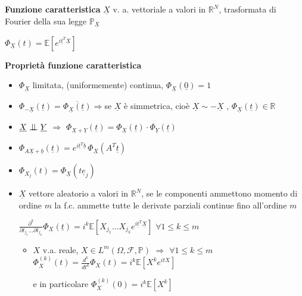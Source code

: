 \documentclass[openany]{book} %
\newcommand{\ind}{\mathrel{\text{\scalebox{1.07}{$\perp\mkern-10mu\perp$}}}}
\begin{document}
\textbf{Funzione caratteristica} $\underline{X}$ v. a. vettoriale a valori in $\mathbb{R}^N$, trasformata di Fourier della sua legge $\mathbb{P}_{\underline{X}}$

$\Phi_{\underline{X}}(t)=\mathbb{E}\left[e^{i \underline{t}^T \underline{X}}\right]$

\textbf{Proprietà funzione caratteristica}

\begin{itemize}

\item $\Phi_{\underline{X}}$ limitata, (uniformemente) continua, $\Phi_{\underline{X}}(\underline{0})=1$

\item $\Phi_{-\underline{X}}(\underline{t}) = \overline{\Phi_{\underline{X}}(\underline{t})}$\quad$ \Rightarrow$\quad se $\underline{X}$ è simmetrica, cioè $\underline{X}\sim-\underline{X}$ , \quad $\Phi_{\underline{X}}(\underline{t})\in \mathbb{R}$

\item $\underline{X}\ind \underline{Y}$ \quad $\Rightarrow$ \quad $\Phi_{\underline{X}+\underline{Y}}(\underline{t})=\Phi_{\underline{X}}(\underline{t})\cdot\Phi_{\underline{Y}}(\underline{t})$

\item $\Phi_{A\underline{X}+\underline{b}}(\underline{t})= e^{i \underline{t}^T \underline{b}}\,\Phi_{\underline{X}}(A^T\underline{t})$

\item $\Phi_{X_j}(t) = \Phi_{\underline{X}}(t\underline{e}_j)$

\item $\underline{X}$ vettore aleatorio a valori in $\mathbb{R}^N$, se le componenti ammettono momento di ordine $m$ la f.c. ammette tutte le derivate parziali continue fino all'ordine $m$

$\frac{\partial^k}{\partial t_{j_1}\dots\partial t_{j_k}}\Phi_{\underline{X}}(\underline{t}) =i^k \mathbb{E}\left[X_{j_1}\dots X_{j_k}e^{i \underline{t}^T \underline{X}}\right]$ \quad $\forall 1\leq k\leq m$

\begin{itemize}

\item $X$ v.a. reale, $X\in L^m(\Omega,\mathcal{F},\mathbb{P})$ \quad $\Rightarrow$ \quad $ \forall 1\leq k \leq m$ \quad $\Phi_X^{(k)}(t)=\frac{d^k}{dt^k}\Phi_X(t)=i^k \mathbb{E}\left[X^ke^{itX}\right]$ 

e in particolare $\Phi_X^{(k)}(0)=i^k \mathbb{E}\left[X^k\right]$ 


\end{itemize}
\end{itemize}
\end{document}

